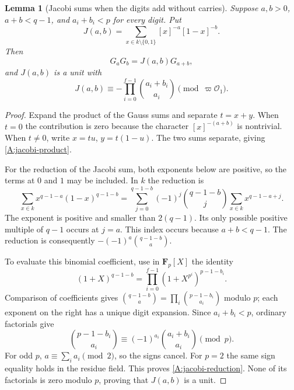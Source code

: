 \documentclass[11pt]{amsart}
\newtheorem{lemma}[theorem]{Lemma}
\theoremstyle{definition}
\theoremstyle{remark}
\newcommand{\F}{\mathbf F}
\newcommand{\OO}{\mathcal O}\newcommand{\pp}{\mathfrak p}\newcommand{\PP}{\mathfrak P}
\begin{document}
\begin{lemma}[Jacobi sums when the digits add without carries]
\label{A:jacobi-unit}
Suppose $a,b>0$, $a+b<q-1$, and $a_i+b_i<p$ for every digit. Put
\[
 J(a,b)=\sum_{x\in k\setminus\{0,1\}}[x]^{-a}[1-x]^{-b}.
\]
Then
\begin{equation}\label{A:jacobi-product}
 G_aG_b=J(a,b)G_{a+b},
\end{equation}
and $J(a,b)$ is a unit with
\begin{equation}\label{A:jacobi-reduction}
 J(a,b)\equiv-\prod_{i=0}^{f-1}\binom{a_i+b_i}{a_i}
                  \pmod{\varpi\OO_1}.
\end{equation}
\end{lemma}
\begin{proof}
Expand the product of the Gauss sums and separate $t=x+y$. When $t=0$
the contribution is zero because the character $[x]^{-(a+b)}$ is
nontrivial. When $t\ne0$, write $x=tu$, $y=t(1-u)$. The two sums
separate, giving \eqref{A:jacobi-product}.

For the reduction of the Jacobi sum, both exponents below are positive,
so the terms at $0$ and $1$ may be included. In $k$ the reduction is
\[
 \sum_{x\in k}x^{q-1-a}(1-x)^{q-1-b}
 =\sum_{j=0}^{q-1-b}(-1)^j\binom{q-1-b}{j}
                          \sum_{x\in k}x^{q-1-a+j}.
\]
The exponent is positive and smaller than $2(q-1)$. Its only possible
positive multiple of $q-1$ occurs at $j=a$. This index occurs because
$a+b<q-1$. The reduction is consequently
$-(-1)^a\binom{q-1-b}{a}$.

To evaluate this binomial coefficient, use in $\F_p[X]$ the identity
\[
 (1+X)^{q-1-b}
    =\prod_{i=0}^{f-1}(1+X^{p^i})^{p-1-b_i}.
\]
Comparison of coefficients gives
$\binom{q-1-b}{a}=\prod_i\binom{p-1-b_i}{a_i}$ modulo $p$;
each exponent on the right has a unique digit expansion. Since
$a_i+b_i<p$, ordinary factorials give
\[
 \binom{p-1-b_i}{a_i}
       \equiv(-1)^{a_i}\binom{a_i+b_i}{a_i}\pmod p.
\]
For odd $p$, $a\equiv\sum_i a_i\pmod2$, so the signs cancel.
For $p=2$ the same sign equality holds in the residue field.
This proves \eqref{A:jacobi-reduction}. None of its factorials is
zero modulo $p$, proving that $J(a,b)$ is a unit.
\end{proof}
\end{document}
